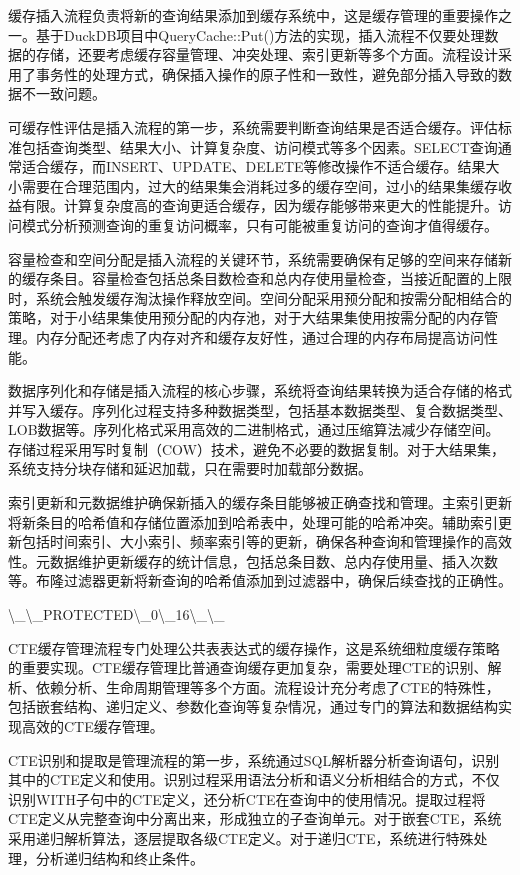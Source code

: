 缓存插入流程负责将新的查询结果添加到缓存系统中，这是缓存管理的重要操作之一。基于DuckDB项目中QueryCache::Put()方法的实现，插入流程不仅要处理数据的存储，还要考虑缓存容量管理、冲突处理、索引更新等多个方面。流程设计采用了事务性的处理方式，确保插入操作的原子性和一致性，避免部分插入导致的数据不一致问题。

可缓存性评估是插入流程的第一步，系统需要判断查询结果是否适合缓存。评估标准包括查询类型、结果大小、计算复杂度、访问模式等多个因素。SELECT查询通常适合缓存，而INSERT、UPDATE、DELETE等修改操作不适合缓存。结果大小需要在合理范围内，过大的结果集会消耗过多的缓存空间，过小的结果集缓存收益有限。计算复杂度高的查询更适合缓存，因为缓存能够带来更大的性能提升。访问模式分析预测查询的重复访问概率，只有可能被重复访问的查询才值得缓存。

容量检查和空间分配是插入流程的关键环节，系统需要确保有足够的空间来存储新的缓存条目。容量检查包括总条目数检查和总内存使用量检查，当接近配置的上限时，系统会触发缓存淘汰操作释放空间。空间分配采用预分配和按需分配相结合的策略，对于小结果集使用预分配的内存池，对于大结果集使用按需分配的内存管理。内存分配还考虑了内存对齐和缓存友好性，通过合理的内存布局提高访问性能。

数据序列化和存储是插入流程的核心步骤，系统将查询结果转换为适合存储的格式并写入缓存。序列化过程支持多种数据类型，包括基本数据类型、复合数据类型、LOB数据等。序列化格式采用高效的二进制格式，通过压缩算法减少存储空间。存储过程采用写时复制（COW）技术，避免不必要的数据复制。对于大结果集，系统支持分块存储和延迟加载，只在需要时加载部分数据。

索引更新和元数据维护确保新插入的缓存条目能够被正确查找和管理。主索引更新将新条目的哈希值和存储位置添加到哈希表中，处理可能的哈希冲突。辅助索引更新包括时间索引、大小索引、频率索引等的更新，确保各种查询和管理操作的高效性。元数据维护更新缓存的统计信息，包括总条目数、总内存使用量、插入次数等。布隆过滤器更新将新查询的哈希值添加到过滤器中，确保后续查找的正确性。

\textbackslash{}_\textbackslash{}_PROTECTED\textbackslash{}_0\textbackslash{}_16\textbackslash{}_\textbackslash{}_

CTE缓存管理流程专门处理公共表表达式的缓存操作，这是系统细粒度缓存策略的重要实现。CTE缓存管理比普通查询缓存更加复杂，需要处理CTE的识别、解析、依赖分析、生命周期管理等多个方面。流程设计充分考虑了CTE的特殊性，包括嵌套结构、递归定义、参数化查询等复杂情况，通过专门的算法和数据结构实现高效的CTE缓存管理。

CTE识别和提取是管理流程的第一步，系统通过SQL解析器分析查询语句，识别其中的CTE定义和使用。识别过程采用语法分析和语义分析相结合的方式，不仅识别WITH子句中的CTE定义，还分析CTE在查询中的使用情况。提取过程将CTE定义从完整查询中分离出来，形成独立的子查询单元。对于嵌套CTE，系统采用递归解析算法，逐层提取各级CTE定义。对于递归CTE，系统进行特殊处理，分析递归结构和终止条件。

